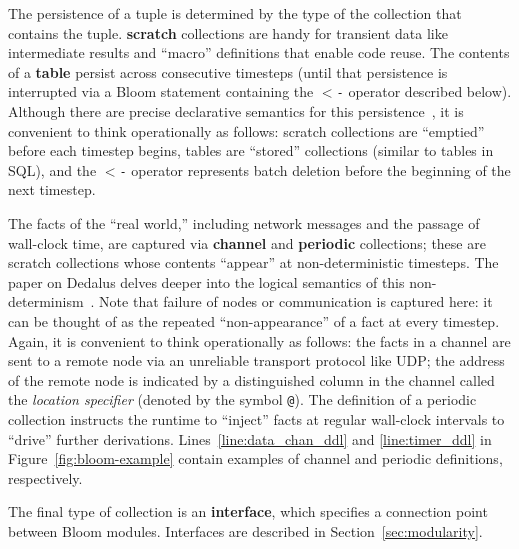 The persistence of a tuple is determined by the type of the collection that
contains the tuple. \textbf{scratch} collections are handy for transient data
like intermediate results and ``macro'' definitions that enable code reuse. The
contents of a \textbf{table} persist across consecutive timesteps (until that
persistence is interrupted via a Bloom statement containing the \texttt{$<$-}
operator described below). Although there are precise declarative semantics for
this persistence~\cite{dedalus}, it is convenient to think operationally as
follows: scratch collections are ``emptied'' before each timestep begins, tables
are ``stored'' collections (similar to tables in SQL), and the \texttt{$<$-}
operator represents batch deletion before the beginning of the next timestep.

The facts of the ``real world,'' including network messages and the passage of
wall-clock time, are captured via \textbf{channel} and \textbf{periodic}
collections; these are scratch collections whose contents ``appear'' at
non-deterministic timesteps.  The paper on Dedalus delves deeper into the
logical semantics of this non-determinism~\cite{dedalus}. Note that failure of
nodes or communication is captured here: it can be thought of as the repeated
``non-appearance'' of a fact at every timestep.  Again, it is convenient to
think operationally as follows: the facts in a channel are sent to a remote node
via an unreliable transport protocol like UDP; the address of the remote node is
indicated by a distinguished column in the channel called the \emph{location
  specifier} (denoted by the symbol \texttt{@}). The definition of a periodic
collection instructs the runtime to ``inject'' facts at regular wall-clock
intervals to ``drive'' further derivations. Lines~\ref{line:data_chan_ddl} and
\ref{line:timer_ddl} in Figure~\ref{fig:bloom-example} contain examples of
channel and periodic definitions, respectively.

The final type of collection is an \textbf{interface}, which specifies a
connection point between Bloom modules. Interfaces are described in
Section~\ref{sec:modularity}.

